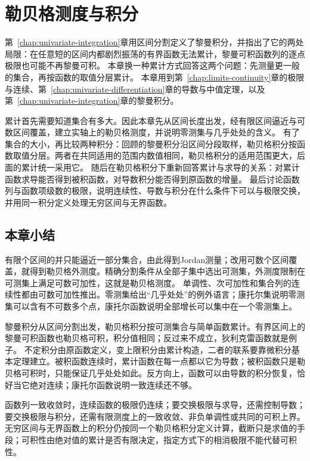 \chapter{勒贝格测度与积分}
\label{chap:measurable-functions}

第~\ref{chap:univariate-integration}章用区间分割定义了黎曼积分，并指出了它的两处局限：在任意短的区间内都剧烈振荡的有界函数无法累计，黎曼可积函数列的逐点极限也可能不再黎曼可积。
本章换一种累计方式回答这两个问题：先测量更一般的集合，再按函数的取值分层累计。
本章用到第~\ref{chap:limits-continuity}章的极限与连续、第~\ref{chap:univariate-differentiation}章的导数与中值定理，以及第~\ref{chap:univariate-integration}章的黎曼积分。

累计首先需要知道集合有多大。因此本章先从区间长度出发，经有限区间逼近与可数区间覆盖，建立实轴上的勒贝格测度，并说明零测集与几乎处处的含义。
有了集合的大小，再比较两种积分：回顾的黎曼积分沿区间分段取样，勒贝格积分按函数取值分层。两者在共同适用的范围内数值相同，勒贝格积分的适用范围更大，后面的累计统一采用它。
随后在勒贝格积分下重新回答累计与求导的关系：对累计函数求导能否得到被积函数，对导数积分能否得到原函数的增量。
最后讨论函数列与函数项级数的极限，说明连续性、导数与积分在什么条件下可以与极限交换，并用同一积分定义处理无穷区间与无界函数。




\FloatBarrier
\section{本章小结}
\label{sec:measurable-summary}

有限个区间的并只能逼近一部分集合，由此得到Jordan测量；改用可数个区间覆盖，就得到勒贝格外测度。精确分割条件从全部子集中选出可测集，外测度限制在可测集上满足可数可加性，这就是勒贝格测度。
单调性、次可加性和集合列的连续性都由可数可加性推出。零测集给出“几乎处处”的例外语言；康托尔集说明零测集可以含有不可数多个点，康托尔函数说明全部增长可以集中在一个零测集上。

黎曼积分从区间分割出发，勒贝格积分按可测集合与简单函数累计。有界区间上的黎曼可积函数也勒贝格可积，积分值相同；反过来不成立，狄利克雷函数就是例子。
不定积分由原函数定义，变上限积分由累计构造，二者的联系要靠微积分基本定理建立。被积函数连续时，累计函数在每一点都以它为导数；被积函数只是勒贝格可积时，只能保证几乎处处如此。反方向上，函数可以由导数的积分恢复，恰好当它绝对连续；康托尔函数说明一致连续还不够。

函数列一致收敛时，连续函数的极限仍连续；要交换极限与求导，还需控制导数；要交换极限与积分，还需有限测度上的一致收敛、非负单调性或共同的可积上界。
无穷区间与无界函数上的积分仍按同一个勒贝格积分定义计算，截断只是求值的手段；可积性由绝对值的累计是否有限决定，指定方式下的相消极限不能代替可积性。

